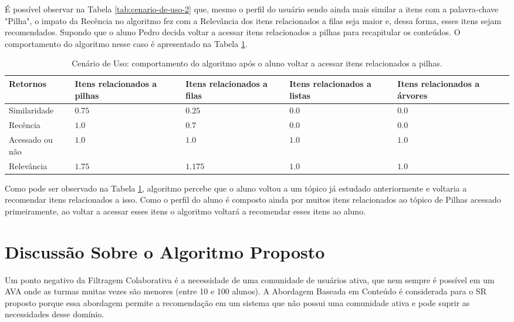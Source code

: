 É possível observar na Tabela \ref{tab:cenario-de-uso-2} que, mesmo o perfil do usuário sendo ainda mais similar a itens com a palavra-chave "Pilha",
o impato da Recência no algoritmo fez com a Relevância dos itens relacionados a filas seja maior e, dessa forma, esses
itens sejam recomendados. Supondo que o aluno Pedro decida voltar a acessar itens relacionados a pilhas para
recapitular os conteúdos. O comportamento do algoritmo nesse caso é apresentado na Tabela \ref{tab:cenario-de-uso-3}.

\begin{table}[h]
\footnotesize
\caption[Cenário de Uso: comportamento do algoritmo após o aluno voltar a acessar itens relacionados a pilhas.]{Cenário de Uso: comportamento do algoritmo após o aluno voltar a acessar itens relacionados a pilhas.}
\label{tab:cenario-de-uso-3}
\centering
\begin{tabular}{|p{2cm}|p{2.5cm}|p{2.5cm}|p{2.5cm}|p{2.5cm}|}
  \hline
  \textbf{Retornos} & \textbf{Itens relacionados a pilhas} & \textbf{Itens relacionados a filas} & \textbf{Itens relacionados a listas} & \textbf{Itens relacionados a árvores} \\
  \hline
  Similaridade & $0.75$ & $0.25$ & $0.0$ & $0.0$ \\
  \hline
  Recência & $1.0$ & $0.7$ & $0.0$ & $0.0$ \\
  \hline
  Acessado ou não & $1.0$ & $1.0$ & $1.0$ & $1.0$ \\
  \hline
  Relevância & $1.75$ & $1.175$ & $1.0$ & $1.0$ \\
  \hline
\end{tabular}
\end{table}

Como pode ser observado na Tabela \ref{tab:cenario-de-uso-3}, algoritmo percebe que o aluno voltou a um tópico já estudado anteriormente e
voltaria a recomendar itens relacionados a isso. Como o perfil do aluno é composto ainda por muitos itens relacionados ao tópico
de Pilhas acessado primeiramente, ao voltar a acessar esses itens o algoritmo voltará a recomendar esses itens
ao aluno.

\section{Discussão Sobre o Algoritmo Proposto}

Um ponto negativo da Filtragem Colaborativa é a necessidade de uma comunidade de usuários ativa, que nem sempre é
possível em um AVA onde as turmas muitas vezes são menores (entre 10 e 100 alunos). A Abordagem Baseada
em Conteúdo é considerada para o SR proposto porque essa abordagem permite a recomendação em um sistema que não possui uma
comunidade ativa e pode suprir as necessidades desse domínio.

